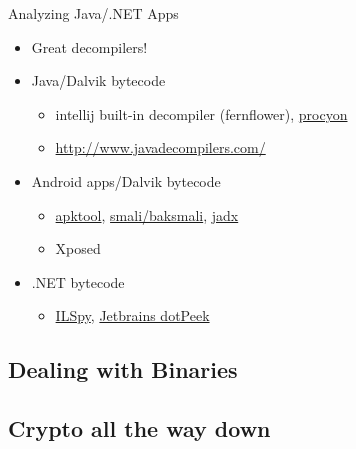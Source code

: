 \begin{frame}[fragile]
  {Analyzing Java/.NET Apps}

  \begin{itemize}
    \item Great decompilers!
    \item Java/Dalvik bytecode
      \begin{itemize}
        \item intellij built-in decompiler (fernflower),
          \href{https://bitbucket.org/mstrobel/procyon/}{procyon}
        \item \url{http://www.javadecompilers.com/}
      \end{itemize}
    \item Android apps/Dalvik bytecode
      \begin{itemize}
        \item \href{http://ibotpeaches.github.io/Apktool/}{apktool},
          \href{https://bitbucket.org/JesusFreke/smali/}{smali/baksmali},
          \href{https://github.com/skylot/jadx}{jadx}
        \item Xposed
      \end{itemize}
    \item .NET bytecode
      \begin{itemize}
        \item \href{http://ilspy.net/}{ILSpy}, \href{https://www.jetbrains.com/decompiler/}{Jetbrains dotPeek}
      \end{itemize}

  \end{itemize}

\end{frame}


\subsection{Dealing with Binaries}






\subsection{Crypto all the way down}


